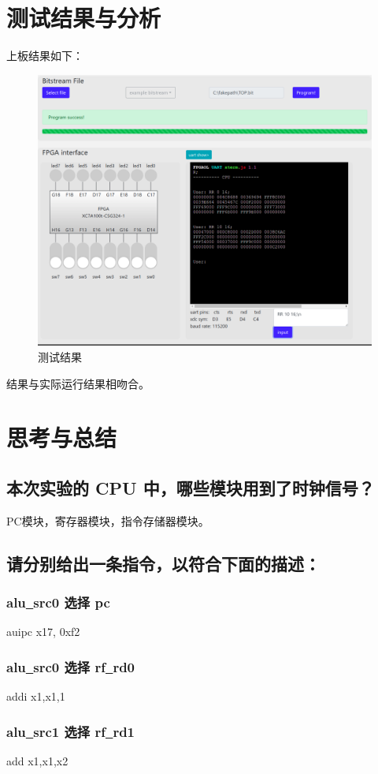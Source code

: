 \documentclass[12pt,a4paper]{ctexart}
\begin{document}
\section{测试结果与分析}
上板结果如下：
\begin{figure}[H]
    \centering
    \includegraphics[scale=0.5]{pic/6.png}
    \caption{测试结果}
\end{figure}
结果与实际运行结果相吻合。
\section{思考与总结}
\subsection{本次实验的 CPU 中，哪些模块用到了时钟信号？}
PC模块，寄存器模块，指令存储器模块。
\subsection{请分别给出一条指令，以符合下面的描述：}
\subsubsection{alu\underline{~}src0 选择 pc}
auipc x17, 0xf2
\subsubsection{alu\underline{~}src0 选择 rf\underline{~}rd0}
addi x1,x1,1
\subsubsection{alu\underline{~}src1 选择 rf\underline{~}rd1}
add x1,x1,x2
\end{document}
